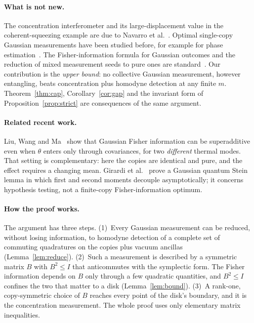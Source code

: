 \documentclass[11pt,a4paper]{article}
\theoremstyle{definition}\newtheorem{definition}{Definition}
\theoremstyle{remark}\newtheorem{remark}{Remark}
\begin{document}
\paragraph{What is not new.}
The concentration interferometer and its large-displacement value in the coherent-squeezing example are due to Navarro et al.~\cite{Navarro2025}. Optimal single-copy Gaussian measurements have been studied before, for example for phase estimation~\cite{Oh2019}. The Fisher-information formula for Gaussian outcomes and the reduction of mixed measurement seeds to pure ones are standard~\cite{Cenni2022,Navarro2025}. Our contribution is the \emph{upper bound}: no collective Gaussian measurement, however entangling, beats concentration plus homodyne detection at any finite $m$. Theorem~\ref{thm:cap}, Corollary~\ref{cor:gap} and the invariant form of Proposition~\ref{prop:strict} are consequences of the same argument.

\paragraph{Related recent work.}
Liu, Wang and Ma~\cite{Liu2026} show that Gaussian Fisher information can be superadditive even when $\theta$ enters only through covariances, for two \emph{different} thermal modes. That setting is complementary: here the copies are identical and pure, and the effect requires a changing mean. Girardi et al.~\cite{Girardi2026} prove a Gaussian quantum Stein lemma in which first and second moments decouple asymptotically; it concerns hypothesis testing, not a finite-copy Fisher-information optimum.

\paragraph{How the proof works.}
The argument has three steps. (1)~Every Gaussian measurement can be reduced, without losing information, to homodyne detection of a complete set of commuting quadratures on the copies plus vacuum ancillas (Lemma~\ref{lem:reduce}). (2)~Such a measurement is described by a symmetric matrix $B$ with $B^2\le I$ that anticommutes with the symplectic form. The Fisher information depends on $B$ only through a few quadratic quantities, and $B^2\le I$ confines the two that matter to a disk (Lemma~\ref{lem:bound}). (3)~A rank-one, copy-symmetric choice of $B$ reaches every point of the disk's boundary, and it is the concentration measurement. The whole proof uses only elementary matrix inequalities.
\end{document}
